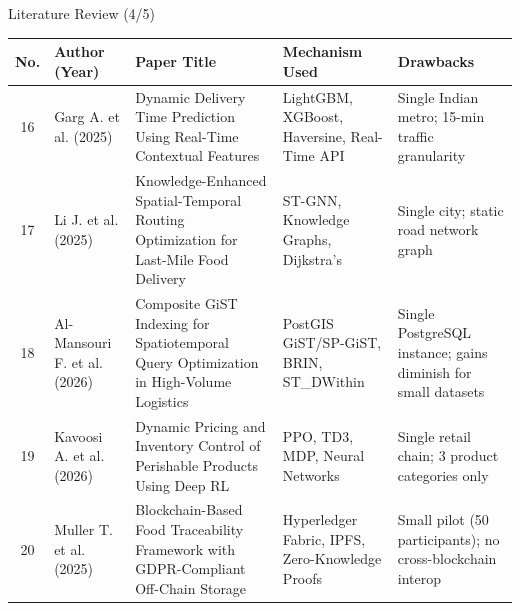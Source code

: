 \documentclass[aspectratio=169,xcolor=dvipsnames]{beamer}
\begin{document}
\begin{frame}{Literature Review (4/5)}
\scriptsize
\renewcommand{\arraystretch}{1.35}
\setlength{\tabcolsep}{3pt}

\begin{tabular}{|c|p{2.0cm}|p{3.0cm}|p{2.8cm}|p{3.0cm}|}
\hline
\textbf{No.} &
\textbf{Author (Year)} &
\textbf{Paper Title} &
\textbf{Mechanism Used} &
\textbf{Drawbacks} \\
\hline

16 &
Garg A. et al. (2025) &
Dynamic Delivery Time Prediction Using Real-Time Contextual Features &
LightGBM, XGBoost, Haversine, Real-Time API &
Single Indian metro; 15-min traffic granularity \\
\hline

17 &
Li J. et al. (2025) &
Knowledge-Enhanced Spatial-Temporal Routing Optimization for Last-Mile Food Delivery &
ST-GNN, Knowledge Graphs, Dijkstra's &
Single city; static road network graph \\
\hline

18 &
Al-Mansouri F. et al. (2026) &
Composite GiST Indexing for Spatiotemporal Query Optimization in High-Volume Logistics &
PostGIS GiST/SP-GiST, BRIN, ST\_DWithin &
Single PostgreSQL instance; gains diminish for small datasets \\
\hline

19 &
Kavoosi A. et al. (2026) &
Dynamic Pricing and Inventory Control of Perishable Products Using Deep RL &
PPO, TD3, MDP, Neural Networks &
Single retail chain; 3 product categories only \\
\hline

20 &
Muller T. et al. (2025) &
Blockchain-Based Food Traceability Framework with GDPR-Compliant Off-Chain Storage &
Hyperledger Fabric, IPFS, Zero-Knowledge Proofs &
Small pilot (50 participants); no cross-blockchain interop \\
\hline

\end{tabular}
\end{frame}
\end{document}
